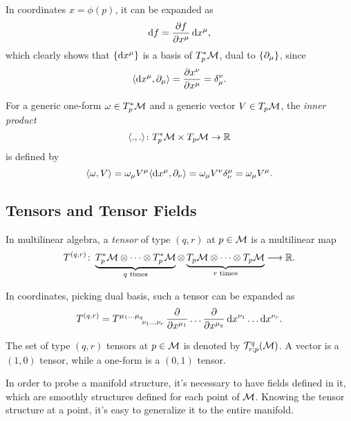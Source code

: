 In coordinates $x = \phi(p)$, it can be expanded as
\begin{equation}
	\mathop{}\!\mathrm{d} f = \frac{\partial f}{\partial x^\mu} \mathop{}\!\mathrm{d} x^\mu,
\end{equation}
which clearly shows that $\{ \mathop{}\!\mathrm{d} x^\mu \}$ is a basis of $T^*_p \mathcal{M}$, dual to $\{ \partial_\mu \}$, since
\begin{equation}
	\langle \mathop{}\!\mathrm{d} x^\mu, \partial_\mu \rangle = \frac{\partial x^\nu}{\partial x^\mu} = \delta^\nu_\mu .
\end{equation}

For a generic one-form $\omega \in T^*_p \mathcal{M}$ and a generic vector $V \in T_p \mathcal{M}$, the \emph{inner product}
\begin{equation}
    \langle ., . \rangle\colon T^*_p \mathcal{M} \times T_p \mathcal{M} \to \mathbb{R}
\end{equation}
is defined by
\begin{equation}\label{eq:def-inner-product-vector-one-form}
	\langle \omega, V \rangle = \omega_\mu V^\mu \langle \mathop{}\!\mathrm{d} x^\mu, \partial_\nu \rangle = \omega_\mu V^\nu \delta^\mu_\nu = \omega_\mu V^\mu.
\end{equation}

\subsection{Tensors and Tensor Fields}
In multilinear algebra, a \emph{tensor} of type $(q,r)$ at $p \in \mathcal{M}$ is a multilinear map 
\begin{equation}
	T^{(q,r)} \colon
	\underbrace{T^*_p \mathcal{M} \otimes \dots \otimes T^*_p \mathcal{M}}_\text{$q$ times}
	\otimes
	\underbrace{T_p \mathcal{M} \otimes \dots \otimes T_p \mathcal{M}}_\text{$r$ times} \longrightarrow \mathbb{R}.
\end{equation}

In coordinates, picking dual basis, such a tensor can be expanded as
\begin{equation}
	T^{(q,r)} = \tensor{T}{^{\mu_1}^\dots^{\mu_q}_{\nu_1}_\dots_{\nu_r}} \frac{\de}{\de x^{\mu_1}} \dots \frac{\de}{\de x^{\mu_q}} \ud x^{\nu_1} \dots \ud x^{\nu_r}.
\end{equation}

The set of type $(q,r)$ tensors at $p \in \mathcal{M}$ is denoted by $\mathcal{T}^q_{r;p}(\mathcal{M})$. A vector is a $(1,0)$ tensor, while a one-form is a $(0,1)$ tensor.

In order to probe a manifold structure, it's necessary to have fields defined in it, which are smoothly structures defined for each point of $\mathcal{M}$. Knowing the tensor structure at a point, it's easy to generalize it to the entire manifold.

